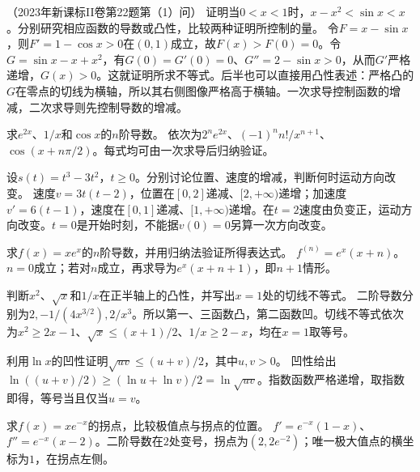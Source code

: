 （2023年新课标II卷第22题第（1）问）
证明当\(0<x<1\)时，\(x-x^2<\sin x<x\)。分别研究相应函数的导数或凸性，比较两种证明所控制的量。
\solutionanswer
令\(F=x-\sin x\)，则\(F'=1-\cos x>0\)在\((0,1)\)成立，故\(F(x)>F(0)=0\)。令\(G=\sin x-x+x^2\)，有\(G(0)=G'(0)=0\)、\(G''=2-\sin x>0\)，从而\(G'\)严格递增，\(G(x)>0\)。这就证明所求不等式。后半也可以直接用凸性表述：严格凸的\(G\)在零点的切线为横轴，所以其右侧图像严格高于横轴。一次求导控制函数的增减，二次求导则先控制导数的增减。


求\(e^{2x}\)、\(1/x\)和\(\cos x\)的\(n\)阶导数。
\solutionanswer
依次为\(2^ne^{2x}\)、\((-1)^n n!/x^{n+1}\)、\(\cos(x+n\pi/2)\)。每式均可由一次求导后归纳验证。


设\(s(t)=t^3-3t^2\)，\(t\ge0\)。分别讨论位置、速度的增减，判断何时运动方向改变。
\solutionanswer
速度\(v=3t(t-2)\)，位置在\([0,2]\)递减、\([2,+\infty)\)递增；加速度\(v'=6(t-1)\)，速度在\([0,1]\)递减、\([1,+\infty)\)递增。在\(t=2\)速度由负变正，运动方向改变。\(t=0\)是开始时刻，不能据\(v(0)=0\)另算一次方向改变。


求\(f(x)=x e^x\)的\(n\)阶导数，并用归纳法验证所得表达式。
\solutionanswer
\(f^{(n)}=e^x(x+n)\)。\(n=0\)成立；若对\(n\)成立，再求导为\(e^x(x+n+1)\)，即\(n+1\)情形。


判断\(x^2\)、\(\sqrt x\)和\(1/x\)在正半轴上的凸性，并写出\(x=1\)处的切线不等式。
\solutionanswer
二阶导数分别为\(2,-1/(4x^{3/2}),2/x^3\)。所以第一、三函数凸，第二函数凹。切线不等式依次为\(x^2\ge2x-1\)、\(\sqrt x\le(x+1)/2\)、\(1/x\ge2-x\)，均在\(x=1\)取等号。


利用\(\ln x\)的凹性证明\(\sqrt{uv}\le(u+v)/2\)，其中\(u,v>0\)。
\solutionanswer
凹性给出\(\ln((u+v)/2)\ge(\ln u+\ln v)/2=\ln\sqrt{uv}\)。指数函数严格递增，取指数即得，等号当且仅当\(u=v\)。


求\(f(x)=x e^{-x}\)的拐点，比较极值点与拐点的位置。
\solutionanswer
\(f'=e^{-x}(1-x)\)、\(f''=e^{-x}(x-2)\)。二阶导数在\(2\)处变号，拐点为\((2,2e^{-2})\)；唯一极大值点的横坐标为\(1\)，在拐点左侧。


